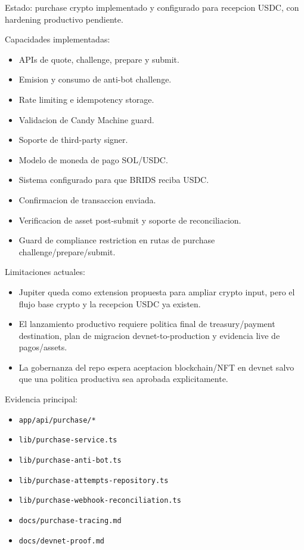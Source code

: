 \documentclass[
  10pt,
  letterpaper,
]{article}
\providecommand{\tightlist}{%
  \setlength{\itemsep}{0pt}\setlength{\parskip}{0pt}}
\let\oldtexttt\texttt
\renewcommand{\texttt}[1]{\oldtexttt{\small #1}}
\begin{document}
Estado: purchase crypto implementado y configurado para recepcion USDC,
con hardening productivo pendiente.

Capacidades implementadas:

\begin{itemize}
\tightlist
\item
  APIs de quote, challenge, prepare y submit.
\item
  Emision y consumo de anti-bot challenge.
\item
  Rate limiting e idempotency storage.
\item
  Validacion de Candy Machine guard.
\item
  Soporte de third-party signer.
\item
  Modelo de moneda de pago SOL/USDC.
\item
  Sistema configurado para que BRIDS reciba USDC.
\item
  Confirmacion de transaccion enviada.
\item
  Verificacion de asset post-submit y soporte de reconciliacion.
\item
  Guard de compliance restriction en rutas de purchase
  challenge/prepare/submit.
\end{itemize}

Limitaciones actuales:

\begin{itemize}
\tightlist
\item
  Jupiter queda como extension propuesta para ampliar crypto input, pero
  el flujo base crypto y la recepcion USDC ya existen.
\item
  El lanzamiento productivo requiere politica final de treasury/payment
  destination, plan de migracion devnet-to-production y evidencia live
  de pagos/assets.
\item
  La gobernanza del repo espera aceptacion blockchain/NFT en devnet
  salvo que una politica productiva sea aprobada explicitamente.
\end{itemize}

Evidencia principal:

\begin{itemize}
\tightlist
\item
  \texttt{app/api/purchase/*}
\item
  \texttt{lib/purchase-service.ts}
\item
  \texttt{lib/purchase-anti-bot.ts}
\item
  \texttt{lib/purchase-attempts-repository.ts}
\item
  \texttt{lib/purchase-webhook-reconciliation.ts}
\item
  \texttt{docs/purchase-tracing.md}
\item
  \texttt{docs/devnet-proof.md}
\end{itemize}
\end{document}
